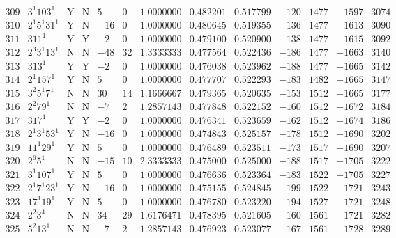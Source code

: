\documentclass[11pt,reqno,a4letter]{article}
\numberwithin{equation}{section}
\numberwithin{figure}{section}
\numberwithin{table}{section}
\theoremstyle{plain}
\numberwithin{theorem}{section}
\theoremstyle{definition}
\begin{document}
\begin{table}[ht]
\begin{equation*}
{\begin{array}{cc|cc|ccc|cc|cccc}
 309 & 3^1 103^1 & \text{Y} & \text{N} & 5 & 0 & 1.0000000 & 0.482201 & 0.517799 & -120 & 1477 & -1597 & 3074 \\
 310 & 2^1 5^1 31^1 & \text{Y} & \text{N} & -16 & 0 & 1.0000000 & 0.480645 & 0.519355 & -136 & 1477 & -1613 & 3090 \\
 311 & 311^1 & \text{Y} & \text{Y} & -2 & 0 & 1.0000000 & 0.479100 & 0.520900 & -138 & 1477 & -1615 & 3092 \\
 312 & 2^3 3^1 13^1 & \text{N} & \text{N} & -48 & 32 & 1.3333333 & 0.477564 & 0.522436 & -186 & 1477 & -1663 & 3140 \\
 313 & 313^1 & \text{Y} & \text{Y} & -2 & 0 & 1.0000000 & 0.476038 & 0.523962 & -188 & 1477 & -1665 & 3142 \\
 314 & 2^1 157^1 & \text{Y} & \text{N} & 5 & 0 & 1.0000000 & 0.477707 & 0.522293 & -183 & 1482 & -1665 & 3147 \\
 315 & 3^2 5^1 7^1 & \text{N} & \text{N} & 30 & 14 & 1.1666667 & 0.479365 & 0.520635 & -153 & 1512 & -1665 & 3177 \\
 316 & 2^2 79^1 & \text{N} & \text{N} & -7 & 2 & 1.2857143 & 0.477848 & 0.522152 & -160 & 1512 & -1672 & 3184 \\
 317 & 317^1 & \text{Y} & \text{Y} & -2 & 0 & 1.0000000 & 0.476341 & 0.523659 & -162 & 1512 & -1674 & 3186 \\
 318 & 2^1 3^1 53^1 & \text{Y} & \text{N} & -16 & 0 & 1.0000000 & 0.474843 & 0.525157 & -178 & 1512 & -1690 & 3202 \\
 319 & 11^1 29^1 & \text{Y} & \text{N} & 5 & 0 & 1.0000000 & 0.476489 & 0.523511 & -173 & 1517 & -1690 & 3207 \\
 320 & 2^6 5^1 & \text{N} & \text{N} & -15 & 10 & 2.3333333 & 0.475000 & 0.525000 & -188 & 1517 & -1705 & 3222 \\
 321 & 3^1 107^1 & \text{Y} & \text{N} & 5 & 0 & 1.0000000 & 0.476636 & 0.523364 & -183 & 1522 & -1705 & 3227 \\
 322 & 2^1 7^1 23^1 & \text{Y} & \text{N} & -16 & 0 & 1.0000000 & 0.475155 & 0.524845 & -199 & 1522 & -1721 & 3243 \\
 323 & 17^1 19^1 & \text{Y} & \text{N} & 5 & 0 & 1.0000000 & 0.476780 & 0.523220 & -194 & 1527 & -1721 & 3248 \\
 324 & 2^2 3^4 & \text{N} & \text{N} & 34 & 29 & 1.6176471 & 0.478395 & 0.521605 & -160 & 1561 & -1721 & 3282 \\
 325 & 5^2 13^1 & \text{N} & \text{N} & -7 & 2 & 1.2857143 & 0.476923 & 0.523077 & -167 & 1561 & -1728 & 3289 \\

\end{array}}
\end{equation*}
\end{table}
\end{document}
